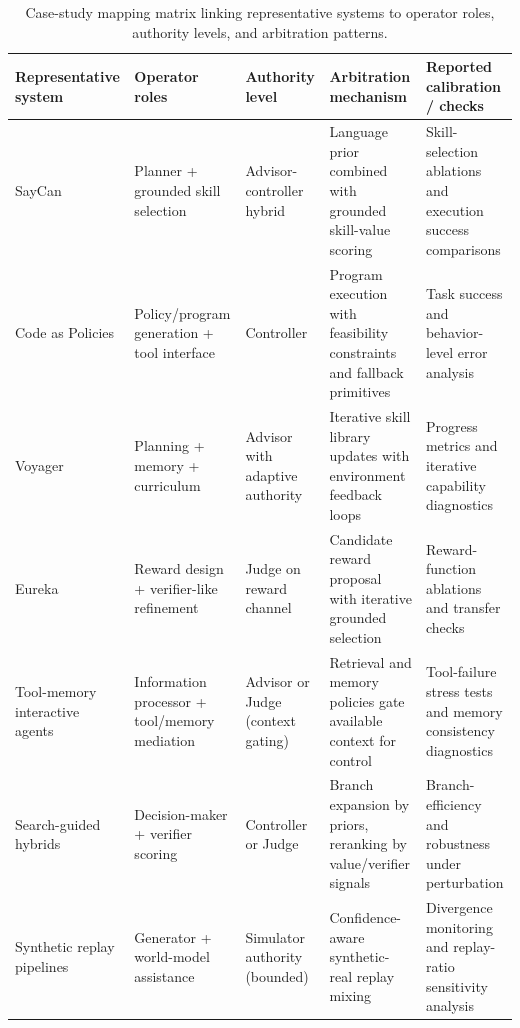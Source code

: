 \documentclass[pdflatex,sn-mathphys-num]{sn-jnl}
\begin{document}
\begin{table}[t]
\centering
\footnotesize
\setlength{\tabcolsep}{4pt}
\begin{tabularx}{\textwidth}{P{2.6cm}P{2.8cm}P{1.8cm}P{3.1cm}Y}
\toprule
\textbf{Representative system} & \textbf{Operator roles} & \textbf{Authority level} & \textbf{Arbitration mechanism} & \textbf{Reported calibration / checks}\\
\midrule
SayCan \cite{arxiv_p_2204_01691} & Planner + grounded skill selection & Advisor-controller hybrid & Language prior combined with grounded skill-value scoring & Skill-selection ablations and execution success comparisons \\
Code as Policies \cite{doi_p_10_1109_icra48891_2023_10160591} & Policy/program generation + tool interface & Controller & Program execution with feasibility constraints and fallback primitives & Task success and behavior-level error analysis \\
Voyager \cite{arxiv_p_2305_16291} & Planning + memory + curriculum & Advisor with adaptive authority & Iterative skill library updates with environment feedback loops & Progress metrics and iterative capability diagnostics \\
Eureka \cite{arxiv_p_2310_12931} & Reward design + verifier-like refinement & Judge on reward channel & Candidate reward proposal with iterative grounded selection & Reward-function ablations and transfer checks \\
Tool-memory interactive agents \cite{arxiv_p_2404_03648} & Information processor + tool/memory mediation & Advisor or Judge (context gating) & Retrieval and memory policies gate available context for control & Tool-failure stress tests and memory consistency diagnostics \\
Search-guided hybrids \cite{arxiv_p_2602_07848,doi_p_10_48448_q4pk_2g71} & Decision-maker + verifier scoring & Controller or Judge & Branch expansion by priors, reranking by value/verifier signals & Branch-efficiency and robustness under perturbation \\
Synthetic replay pipelines \cite{arxiv_p_2602_02454,arxiv_p_2601_08107} & Generator + world-model assistance & Simulator authority (bounded) & Confidence-aware synthetic-real replay mixing & Divergence monitoring and replay-ratio sensitivity analysis \\
\bottomrule
\end{tabularx}
\caption{Case-study mapping matrix linking representative systems to operator roles, authority levels, and arbitration patterns.}
\label{tab:case_mapping}
\end{table}
\end{document}

